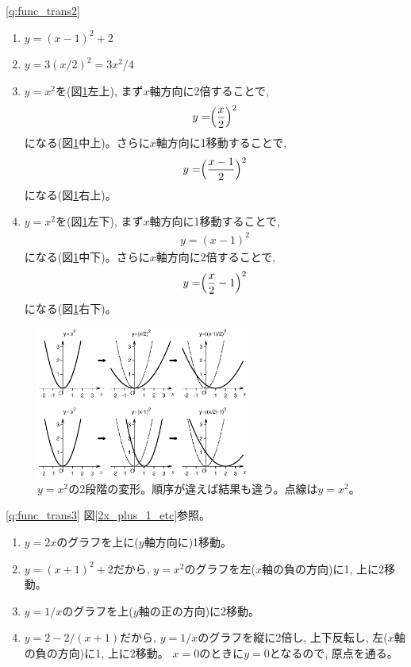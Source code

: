 \ref{q:func_trans2}  
\begin{enumerate}
\item $y=(x-1)^{2}+2$
\vspace{0.1cm}
\item $y=3(x/2)^2=3x^2/4$
\vspace{0.1cm}
\item $y=x^2$を(図\ref{fig:x2_trans}左上), まず$x$軸方向に2倍することで, 
\begin{eqnarray}y=\Bigr(\frac{x}{2}\Bigl)^2\end{eqnarray}
になる(図\ref{fig:x2_trans}中上)。さらに$x$軸方向に1移動することで, 
\begin{eqnarray}y=\Bigr(\frac{x-1}{2}\Bigl)^2\end{eqnarray}
になる(図\ref{fig:x2_trans}右上)。
\item $y=x^2$を(図\ref{fig:x2_trans}左下), まず$x$軸方向に1移動することで, 
\begin{eqnarray}y=(x-1)^2\end{eqnarray}
になる(図\ref{fig:x2_trans}中下)。さらに$x$軸方向に2倍することで, 
\begin{eqnarray}y=\Bigr(\frac{x}{2}-1\Bigl)^2\end{eqnarray}
になる(図\ref{fig:x2_trans}右下)。
\end{enumerate}
\begin{figure}[h]
    \centering
      \includegraphics[width=7.0cm]{x2_trans.eps}
      \caption{$y=x^2$の2段階の変形。順序が違えば結果も違う。点線は$y=x^2$。\label{fig:x2_trans}}
\end{figure}


\ref{q:func_trans3}  図\ref{2x_plus_1_etc}参照。
\begin{enumerate}
\item $y=2x$のグラフを上に($y$軸方向に)1移動。
\item $y=(x+1)^2+2$だから, $y=x^2$のグラフを左($x$軸の負の方向)に1, 上に2移動。
\item $y=1/x$のグラフを上($y$軸の正の方向)に2移動。
\item $y=2-2/(x+1)$だから, $y=1/x$のグラフを縦に2倍し, 上下反転し, 左($x$軸の負の方向)に1, 上に2移動。
$x=0$のときに$y=0$となるので, 原点を通る。
\end{enumerate}

